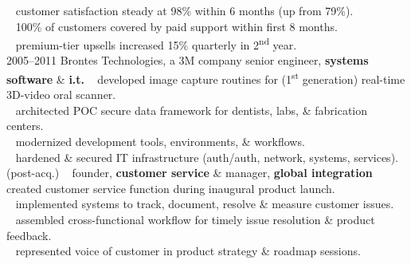 \documentclass[]{friggeri-cv} %
\begin{document}
\begin{entrylist}
{{\tiny {}} ~ customer satisfaction steady at 98\% within 6 months (up from 79\%).\\
{\tiny {}} ~ 100\% of customers covered by paid support within first 8 months.\\
{\tiny {}} ~ premium-tier upsells increased 15\% quarterly in 2\textsuperscript{nd} year.\\}
\entry
{2005--2011}
{Brontes Technologies, a 3M company}
{senior engineer, {\textbf{\color{DarkGray}systems software} \& {\textbf{\color{DarkGray}i.t.}}}}
{{\tiny {}} ~ developed image capture routines for (1\textsuperscript{st} generation) real-time 3D-video oral scanner.\\
{\tiny {}} ~ architected POC secure data framework for dentists, labs, \& fabrication centers.\\
{\tiny {}} ~ modernized development tools, environments, \& workflows.\\
{\tiny {}} ~ hardened \& secured IT infrastructure (auth/auth, network, systems, services).}
\entry
{(post-acq.)}
{~}
{founder, \textbf{\color{DarkGray}customer service} \& manager, \textbf{\color{DarkGray}global integration}}
{{\tiny {}} ~ created customer service function during inaugural product launch.\\
{\tiny {}} ~ implemented systems to track, document, resolve \& measure customer issues.\\
{\tiny {}} ~ assembled cross-functional workflow for timely issue resolution \& product feedback.\\
{\tiny {}} ~ represented voice of customer in product strategy \& roadmap sessions.\\

}
\end{entrylist}
\end{document}
